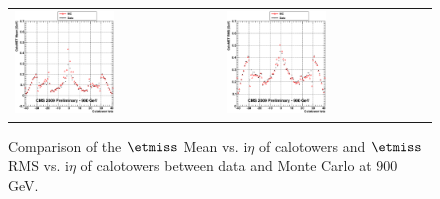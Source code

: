 \begin{figure}[h!]
 \centering
 \begin{tabular}{ll}
  \includegraphics[width=0.5\textwidth]{plots_DataVsMC_MB_900GeV/g_calometPtMean_vs_ieta_900.eps} &
  \includegraphics[width=0.5\textwidth]{plots_DataVsMC_MB_900GeV/g_calometPtRMS_vs_ieta_900.eps} \\
 \end{tabular}
 \caption{\small Comparison of the $\etmiss$ Mean vs. i$\eta$ of calotowers and $\etmiss$ RMS vs. i$\eta$ of calotowers between 
          data and Monte Carlo at $900$ GeV.\label{fig:MET_MeanRMS_vs_ieta_900}}
\end{figure}


